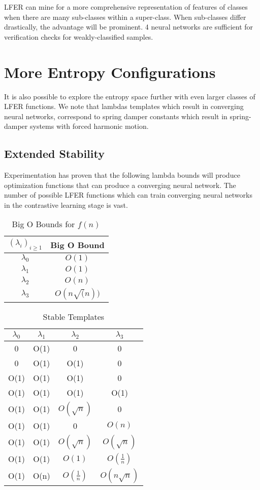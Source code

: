 \documentclass[journal]{journal}
\begin{document}
LFER can mine for a more comprehensive representation of features of classes when there are many sub-classes within a super-class. When sub-classes differ drastically, the advantage will be prominent. 4 neural networks are sufficient for verification checks for weakly-classified samples.

\section{More Entropy Configurations}
 It is also possible to explore the entropy space further with even larger classes of LFER functions. We note that lambdas templates which result in converging neural networks, correspond to spring damper constants which result in spring-damper systems with forced harmonic motion.

\subsection{Extended Stability}
 Experimentation has proven that the following lambda bounds will produce optimization functions that can produce a converging neural network. The number of possible LFER functions which can train converging neural networks in the contrastive learning stage is vast.  

\begin{table}[h]
\centering

\label{tab:tabel3}
\begin{tabular}{|c|c|}
\hline
$(\lambda_{i})_{i \geq 1} $ & Big O Bound  \\ \hline
$\lambda_{0}$ & $O(1)$ \\
$\lambda_{1}$ & $O(1)$ \\
$\lambda_{2}$ & $O(n)$ \\
$\lambda_{3}$ & $O(n\sqrt(n))$ \\
\hline
\end{tabular}
\caption{Big O Bounds for $f(n)$}
\end{table}

\begin{table}[h]
\centering

\label{tab:tablea3}
\begin{tabular}{|c|c|c|c|}
\hline
$\lambda_{0}$ & $\lambda_{1}$ & $\lambda_{2}$ & $\lambda_{3}$  \\ \hline
0 & O(1) & 0 & 0 \\
0 & O(1) & O(1) & 0 \\
O(1) & O(1) & O(1) & 0 \\
O(1) & O(1) & O(1) & O(1) \\
O(1) & O(1) & $O(\sqrt{n})$ & 0 \\
O(1) & O(1) & 0 & $O(n)$ \\
O(1) & O(1) & $O(\sqrt{n})$ & $O(\sqrt{n})$ \\
O(1) & O(1) & $O(1)$ & $O(\frac{1}{n})$  \\
O(1) & O(n) & $O(\frac{1}{n})$ & $O(n\sqrt{n})$ \\
\hline
\end{tabular}
\caption{Stable Templates}
\end{table}
\end{document}

